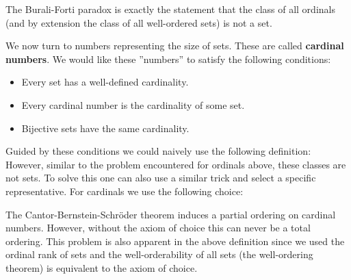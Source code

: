 
    \begin{remark}
        The Burali-Forti paradox is exactly the statement that the class of all ordinals (and by extension the class of all well-ordered sets) is not a set.
    \end{remark}

    We now turn to numbers representing the size of sets. These are called \textbf{cardinal numbers}. We would like these ''numbers'' to satisfy the following conditions:
    \begin{itemize}
        \item Every set has a well-defined cardinality.
        \item Every cardinal number is the cardinality of some set.
        \item Bijective sets have the same cardinality.
    \end{itemize}
    Guided by these conditions we could naively use the following definition:
    However, similar to the problem encountered for ordinals above, these classes are not sets. To solve this one can also use a similar trick and select a specific representative. For cardinals we use the following choice:

    \begin{remark}
        The Cantor-Bernstein-Schr\"oder theorem induces a partial ordering on cardinal numbers. However, without the axiom of choice this can never be a total ordering. This problem is also apparent in the above definition since we used the ordinal rank of sets and the well-orderability of all sets (the well-ordering theorem) is equivalent to the axiom of choice.
    \end{remark}

